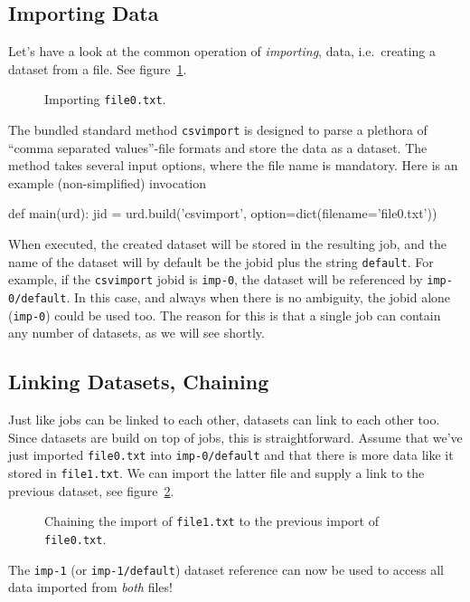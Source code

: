 \subsection{Importing Data}

Let's have a look at the common operation of \textsl{importing},
data, i.e.\ creating a dataset from a file.  See
figure~\ref{fig:dataset_csvimport}.

\begin{figure}[h!]
  \begin{center}
    
    \caption{Importing \texttt{file0.txt}.}
    \label{fig:dataset_csvimport}
  \end{center}
\end{figure}

\noindent The bundled standard method \texttt{csvimport} is designed
to parse a plethora of ``comma separated values''-file formats and
store the data as a dataset.  The method takes several input options,
where the file name is mandatory.  Here is an example (non-simplified)
invocation
\begin{python}
def main(urd):
    jid = urd.build('csvimport', option=dict(filename='file0.txt'))  
\end{python}
When executed, the created dataset
will be stored in the resulting job, and the name of the dataset will
by default be the jobid plus the string \texttt{default}.  For
example, if the \texttt{csvimport} jobid is \texttt{imp-0}, the
dataset will be referenced by \texttt{imp-0/default}.  In this case,
and always when there is no ambiguity, the jobid alone
(\texttt{imp-0}) could be used too.  The reason for this is that a
single job can contain any number of datasets, as we will see shortly.



\subsection{Linking Datasets, Chaining}

Just like jobs can be linked to each other, datasets can link to
each other too.  Since datasets are build on top of jobs, this is
straightforward.  Assume that we've just imported \texttt{file0.txt}
into \texttt{imp-0/default} and that there is more data like it stored
in \texttt{file1.txt}.  We can import the latter file and supply a
link to the previous dataset, see
figure~\ref{fig:dataset_csvimport_chain}.
\begin{figure}[h!]
  \begin{center}
    
    \caption{Chaining the import of \texttt{file1.txt} to the previous
      import of \texttt{file0.txt}.}
    \label{fig:dataset_csvimport_chain}
  \end{center}
\end{figure}
The \texttt{imp-1} (or \texttt{imp-1/default}) dataset reference can
now be used to access all data imported from \textsl{both} files!

